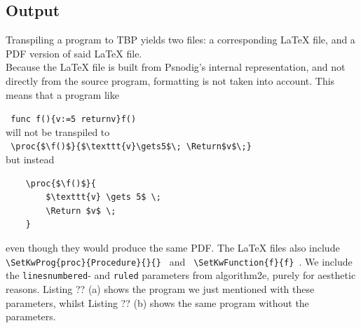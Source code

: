 \subsection{Output}

Transpiling a program to TBP yields two files: a corresponding LaTeX file, and a PDF version of said LaTeX file. \\

Because the LaTeX file is built from Psnodig's internal representation, and not directly from the source program, formatting is not taken into account. This means that a program like

\texttt{ func f()\{v:=5 returnv\}f() } \\

will not be transpiled to \\

\texttt{ \textbackslash proc\{\$\textbackslash f()\$\}\{\$\textbackslash texttt\{v\}\textbackslash gets5\$\textbackslash ; \textbackslash Return\$v\$\textbackslash;\} } \\

but instead

\begin{verbatim}
    \proc{$\f()$}{
        $\texttt{v} \gets 5$ \;
        \Return $v$ \;
    }
\end{verbatim}

even though they would produce the same PDF. The LaTeX files also include \texttt{ \textbackslash SetKwProg\{proc\}\{Procedure\}\{\}\{\} } and \texttt{ \textbackslash SetKwFunction\{f\}\{f\} }. We include the \texttt{linesnumbered}- and \texttt{ruled} parameters from algorithm2e, purely for aesthetic reasons. Listing ?? (a) shows the program we just mentioned with these parameters, whilst Listing ?? (b) shows the same program without the parameters. \\

